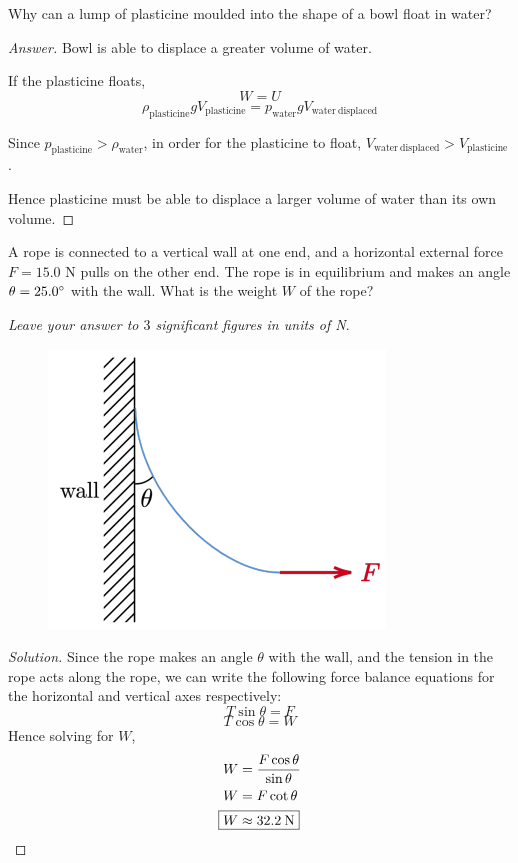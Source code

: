 \begin{prbm}
Why can a lump of plasticine moulded into the shape of a bowl float in water?
\end{prbm}
\begin{proof}[Answer]
Bowl is able to displace a greater volume of water.

If the plasticine floats, 
\[ W = U \]
\[ \rho_{\mathrm{plasticine}} g V_{\mathrm{plasticine}} = p_{\mathrm{water}} g V_{\mathrm{water\:displaced}} \]

Since $p_{\mathrm{plasticine}} > \rho_{\mathrm{water}}$, in order for the plasticine to float, $V_{\mathrm{water\:displaced}} > V_{\mathrm{plasticine}}$.

Hence plasticine must be able to displace a larger volume of water than its own volume.
\end{proof}
\pagebreak

\begin{prbm}
A rope is connected to a vertical wall at one end, and a horizontal external force $F = 15.0$ N pulls on the other end. The rope is in equilibrium and makes an angle $\theta = 25.0\degree$ with the wall. What is the weight $W$ of the rope? 

\textit{Leave your answer to $3$ significant figures in units of \emph{N}}.

\begin{figure}[H]
    \centering
    \includegraphics{images/Mysterious_Rope.png}
\end{figure}
\end{prbm}

\begin{proof}[Solution]
Since the rope makes an angle $\theta$ with the wall, and the tension in the rope acts along the rope, we can write the following force balance equations for the horizontal and vertical axes respectively:
\[ T \sin \theta = F \]
\[ T \cos \theta = W \]
Hence solving for $W$,
\begin{align*}
W &= \frac{F \cos \theta}{\sin \theta} \\
W &= F \cot \theta \\
\Aboxed{W &\approx 32.2\:\unit{N}}
\end{align*}
\end{proof}
\pagebreak

